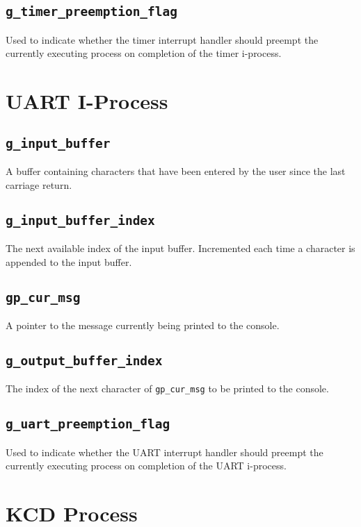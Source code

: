 \documentclass[12pt]{report}
\begin{document}
\subsection{\texttt{g_timer_preemption_flag}}

Used to indicate whether the timer interrupt handler should preempt the currently executing process on completion of the timer i-process.

\section{UART I-Process}
\label{app:uartglobals}

\subsection{\texttt{g_input_buffer}}

A buffer containing characters that have been entered by the user since the last carriage return.

\subsection{\texttt{g_input_buffer_index}}

The next available index of the input buffer. Incremented each time a character is appended to the input buffer. 

\subsection{\texttt{gp_cur_msg}}

A pointer to the message currently being printed to the console.

\subsection{\texttt{g_output_buffer_index}}

The index of the next character of \texttt{gp_cur_msg} to be printed to the console.

\subsection{\texttt{g_uart_preemption_flag}}

Used to indicate whether the UART interrupt handler should preempt the currently executing process on completion of the UART i-process.

\section{KCD Process}
\end{document}
